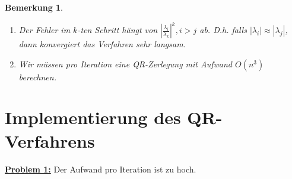 \documentclass{book}
\newtheorem{remark}[algorithm]{Bemerkung}
\begin{document}
            \begin{remark}\label{b4.18}
                \begin{enumerate}
                    \item Der Fehler im $k$-ten Schritt hängt von $\left|\frac{\lambda_i}{\lambda_k}\right|^k,i>j$ ab.
                        D.h. falls $\left\vert \lambda_i \right\vert\approx \left\vert \lambda_j \right\vert$,
                        dann konvergiert das Verfahren sehr langsam.
                    \item Wir müssen pro Iteration eine QR-Zerlegung mit Aufwand $O(n^3)$ berechnen.
                \end{enumerate}
            \end{remark}

        \section{Implementierung des QR-Verfahrens}

            \underline{\textbf{Problem 1:}}  Der Aufwand pro Iteration ist zu hoch.
\end{document}
